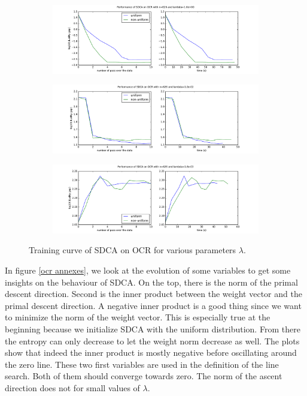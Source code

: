 \documentclass{article}
\DeclareMathOperator{\1}{\mathbb{1}}
\begin{document}
\begin{figure}[ht]
    \centering
    \begin{subfigure}[t]{\textwidth}
        \centering
        \includegraphics[width=\textwidth]{images/20170914_040237_ocr_perf.pdf}
    \end{subfigure}

    \begin{subfigure}[t]{\textwidth}
        \centering
        \includegraphics[width=\textwidth]{images/20170914_041643_ocr_perf.pdf}
    \end{subfigure}

    \begin{subfigure}[t]{\textwidth}
        \centering
        \includegraphics[width=\textwidth]{images/20170914_040715_ocr_perf.pdf}
    \end{subfigure}
    \caption{Training curve of SDCA on OCR for various parameters $\lambda$.}
    \label{training crf}
\end{figure}


In figure \ref{ocr annexes}, we look at the evolution of some variables to get some insights on the behaviour of SDCA. 
On the top, there is the norm of the primal descent direction.
Second is the inner product between the weight vector and the primal descent direction.
A negative inner product is a good thing since we want to minimize the norm of the weight vector.
This is especially true at the beginning because we initialize SDCA with the uniform distribution.
From there the entropy can only decrease to let the weight norm decrease as well.
The plots show that indeed the inner product is mostly negative before oscillating around the zero line. 
These two first variables are used in the definition of the line search.
Both of them should converge towards zero.
The norm of the ascent direction does not for small values of $\lambda$.
\end{document}
